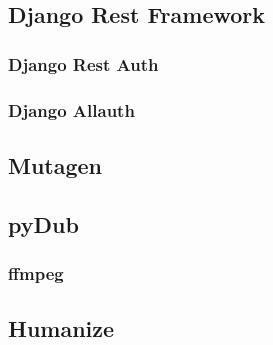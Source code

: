 \subsection{Django Rest Framework}

\subsubsection{Django Rest Auth}

\subsubsection{Django Allauth}

\subsection{Mutagen}

\subsection{pyDub}

\subsubsection{ffmpeg}

\subsection{Humanize}